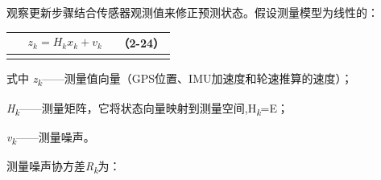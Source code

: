 观察更新步骤结合传感器观测值来修正预测状态。假设测量模型为线性的：

{\def\LTcaptype{none} %
\begin{longtable}[]{@{}
  >{\raggedright\arraybackslash}p{}
  >{\raggedright\arraybackslash}p{}
  >{\raggedright\arraybackslash}p{}@{}}
\toprule\noalign{}
\begin{minipage}[b]{\linewidth}\centering
\end{minipage} & \begin{minipage}[b]{\linewidth}\centering
\[\begin{array}{r}
z_{k} = H_{k}x_{k} + v_{k}
\end{array}\]
\end{minipage} & \begin{minipage}[b]{\linewidth}\raggedleft
（2-24）
\end{minipage} \\
\midrule\noalign{}
\endhead
\bottomrule\noalign{}
\endlastfoot
\end{longtable}
}

式中
\emph{z\textsubscript{k}}------测量值向量（GPS位置、IMU加速度和轮速推算的速度）；

\emph{H\textsubscript{k}}------测量矩阵，它将状态向量映射到测量空间,H\emph{\textsubscript{k}}=E；

\emph{v\textsubscript{k}}------测量噪声。

测量噪声协方差\emph{R\textsubscript{k}}为：

